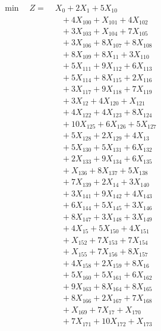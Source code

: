 \documentclass[a4paper,10pt]{article}
\begin{document}
\allowdisplaybreaks
{\small
\begin{align}
\min \quad Z = &\; X_{0} + 2X_{1} + 5X_{10} \\[0.5ex]
&\quad  + 4X_{100} + X_{101} + 4X_{102} \\[0.5ex]
&\quad  + 3X_{103} + X_{104} + 7X_{105} \\[0.5ex]
&\quad  + 3X_{106} + 8X_{107} + 8X_{108} \\[0.5ex]
&\quad  + 8X_{109} + 8X_{11} + 3X_{110} \\[0.5ex]
&\quad  + 5X_{111} + 9X_{112} + 6X_{113} \\[0.5ex]
&\quad  + 5X_{114} + 8X_{115} + 2X_{116} \\[0.5ex]
&\quad  + 3X_{117} + 9X_{118} + 7X_{119} \\[0.5ex]
&\quad  + 3X_{12} + 4X_{120} + X_{121} \\[0.5ex]
&\quad  + 4X_{122} + 4X_{123} + 8X_{124} \\[0.5ex]
&\quad  + 10X_{125} + 6X_{126} + 5X_{127} \\[0.5ex]
&\quad  + 5X_{128} + 2X_{129} + 4X_{13} \\[0.5ex]
&\quad  + 5X_{130} + 5X_{131} + 6X_{132} \\[0.5ex]
&\quad  + 2X_{133} + 9X_{134} + 6X_{135} \\[0.5ex]
&\quad  + X_{136} + 8X_{137} + 5X_{138} \\[0.5ex]
&\quad  + 7X_{139} + 2X_{14} + 3X_{140} \\[0.5ex]
&\quad  + 3X_{141} + 9X_{142} + 4X_{143} \\[0.5ex]
&\quad  + 6X_{144} + 5X_{145} + 3X_{146} \\[0.5ex]
&\quad  + 8X_{147} + 3X_{148} + 3X_{149} \\[0.5ex]
&\quad  + 4X_{15} + 5X_{150} + 4X_{151} \\[0.5ex]
&\quad  + X_{152} + 7X_{153} + 7X_{154} \\[0.5ex]
&\quad  + X_{155} + 7X_{156} + 8X_{157} \\[0.5ex]
&\quad  + 4X_{158} + 2X_{159} + 8X_{16} \\[0.5ex]
&\quad  + 5X_{160} + 5X_{161} + 6X_{162} \\[0.5ex]
&\quad  + 9X_{163} + 8X_{164} + 8X_{165} \\[0.5ex]
&\quad  + 8X_{166} + 2X_{167} + 7X_{168} \\[0.5ex]
&\quad  + X_{169} + 7X_{17} + X_{170} \\[0.5ex]
&\quad  + 7X_{171} + 10X_{172} + X_{173} \\[0.5ex]

\end{align}}
\end{document}
